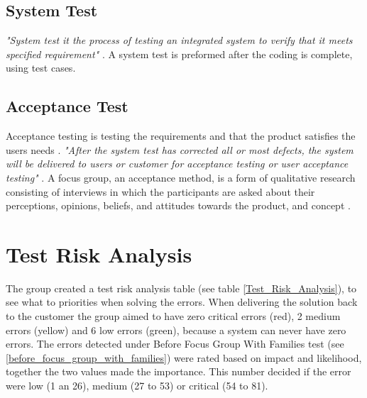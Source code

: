 \subsection{System Test}
\textit{"System test it the process of testing an integrated system to verify that it meets specified requirement"} \cite{systemTest}. A system test is preformed after the coding is complete, using test cases. 

\subsection{Acceptance Test}
Acceptance testing is testing the requirements and that the product satisfies the users needs \cite{acceptanceTesting}. \textit{"After the system test has corrected all or most defects, the system will be delivered to users or customer for acceptance testing or user acceptance testing"} \cite{acceptanceTestingDefinition}. A focus group, an acceptance method, is a form of qualitative research consisting of interviews in which the participants are asked about their perceptions, opinions, beliefs, and attitudes towards the product, and concept \cite{focusGroup}.



\section{Test Risk Analysis}
The group created a test risk analysis table (see table \ref{Test_Risk_Analysis}), to see what to priorities when solving the errors. When delivering the solution back to the customer the group aimed to have zero critical errors (red), 2 medium errors (yellow) and 6 low errors (green), because a system can never have zero errors. The errors detected under Before Focus Group With Families test (see \ref{before_focus_group_with_families}) were rated based on impact and likelihood, together the two values made the importance. This number decided if the error were low (1 an 26), medium (27 to 53) or critical (54 to 81).

